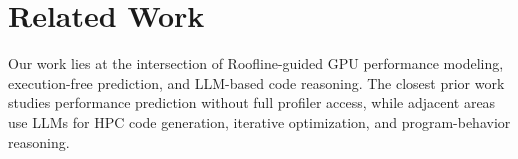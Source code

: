 %
%
%
%
%
%
%
%
%
%
%
%
%


\section{Related Work}
\label{sec:RelatedWorks}

Our work lies at the intersection of Roofline-guided GPU performance modeling, execution-free prediction, and LLM-based code reasoning.
The closest prior work studies performance prediction without full profiler access, while adjacent areas use LLMs for HPC code generation, iterative optimization, and program-behavior reasoning.

